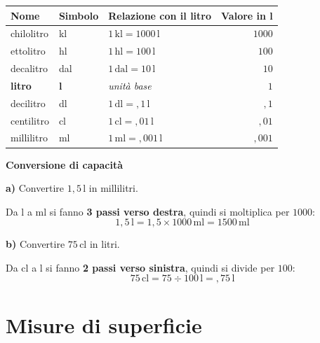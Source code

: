 \begin{center}
    \begin{tabular}{lllr}
        \toprule
        \textbf{Nome}  & \textbf{Simbolo} & \textbf{Relazione con il litro}   & \textbf{Valore in l} \\
        \midrule
        chilolitro     & kl               & $1\,\text{kl} = 1000\,\text{l}$   & $1000$               \\
        ettolitro      & hl               & $1\,\text{hl} = 100\,\text{l}$    & $100$                \\
        decalitro      & dal              & $1\,\text{dal} = 10\,\text{l}$    & $10$                 \\
        \textbf{litro} & \textbf{l}       & \textit{unità base}               & $1$                  \\
        decilitro      & dl               & $1\,\text{dl} = {,}1\,\text{l}$   & ${,}1$               \\
        centilitro     & cl               & $1\,\text{cl} = {,}01\,\text{l}$  & ${,}01$              \\
        millilitro     & ml               & $1\,\text{ml} = {,}001\,\text{l}$ & ${,}001$             \\
        \bottomrule
    \end{tabular}
\end{center}

\begin{esempio}
    \textbf{Conversione di capacità}

    \medskip
    \textbf{a)} Convertire $1{,}5\,\text{l}$ in millilitri.

    Da l a ml si fanno \textbf{3 passi verso destra}, quindi si moltiplica per $1000$:
    \[
        1{,}5\,\text{l} = 1{,}5 \times 1000\,\text{ml} = 1500\,\text{ml}
    \]

    \medskip
    \textbf{b)} Convertire $75\,\text{cl}$ in litri.

    Da cl a l si fanno \textbf{2 passi verso sinistra}, quindi si divide per $100$:
    \[
        75\,\text{cl} = 75 \div 100\,\text{l} = {,}75\,\text{l}
    \]
\end{esempio}

\section{Misure di superficie}

